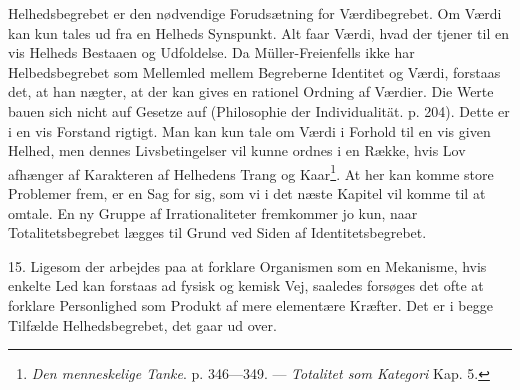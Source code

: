 \documentclass[12pt]{article}
\begin{document}
Helhedsbegrebet er den nødvendige Forudsætning for Værdibegrebet. Om
Værdi kan kun tales ud fra en Helheds Synspunkt. Alt faar Værdi, hvad
der tjener til en vis Helheds Bestaaen og Udfoldelse. Da
Müller-Freienfells ikke har
Helbedsbegrebet som Mellemled mellem Begreberne Identitet og Værdi,
forstaas det, at han nægter, at der kan gives en rationel Ordning af
Værdier. \guillemotright{}Die Werte bauen sich nicht auf Gesetze
auf\guillemotleft{} (\guillemotright{}Philosophie der
Individualität\guillemotleft{}. p. 204). Dette er i en vis Forstand
rigtigt. Man kan kun tale om Værdi i Forhold til en vis given Helhed,
men dennes Livsbetingelser vil kunne ordnes i en Række, hvis Lov
afhænger af Karakteren af Helhedens Trang og Kaar\footnote{\textit{Den
menneskelige Tanke}. p. 346---349. --- \textit{Totalitet som Kategori}
Kap. 5.}. At her kan komme store Problemer frem, er en Sag for sig,
som vi i det næste Kapitel vil komme til at omtale. En ny Gruppe af
Irrationaliteter fremkommer jo kun, naar Totalitetsbegrebet lægges til
Grund ved Siden af Identitetsbegrebet.

15. Ligesom der arbejdes paa at forklare Organismen som en Mekanisme,
hvis enkelte Led kan forstaas ad fysisk og kemisk Vej, saaledes
forsøges det ofte at forklare Personlighed som Produkt af mere
elementære Kræfter. Det er i begge Tilfælde Helhedsbegrebet, det gaar
ud over.
\end{document}
